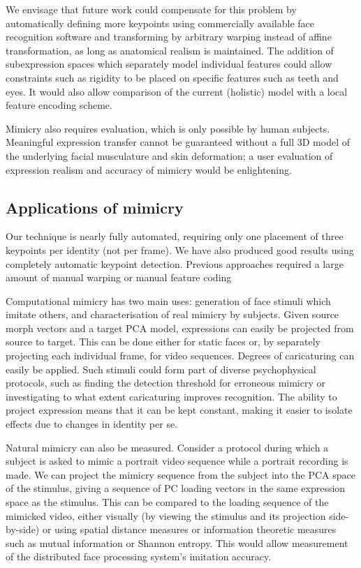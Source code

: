 \documentclass[runningheads]{llncs}
\begin{document}
We envisage that future work could compensate for this problem by automatically defining more keypoints using commercially available face recognition software and transforming by arbitrary warping instead of affine transformation, as long as anatomical realism is maintained.
The addition of subexpression spaces which separately model individual features could allow constraints such as rigidity to be placed on specific features such as teeth and eyes. It would also allow comparison of the current (holistic) model with a local feature encoding scheme.

Mimicry also requires evaluation, which is only possible by human subjects. Meaningful expression transfer cannot be guaranteed without a full 3D model of the underlying facial musculature and skin deformation; a user evaluation of expression realism and accuracy of mimicry would be enlightening.

\subsection{Applications of mimicry}

Our technique is nearly fully automated, requiring only one placement of three keypoints per identity (not per frame). We have also produced good results using completely automatic keypoint detection. Previous approaches required a large amount of manual warping\cite{liu2001expressive} or manual feature coding\cite{theobald2007real} 

Computational mimicry has two main uses: generation of face stimuli which imitate others, and characterisation of real mimicry by subjects.
Given source morph vectors and a target PCA model, expressions can easily be projected from source to target. This can be done either for static faces or, by separately projecting each individual frame, for video sequences. Degrees of caricaturing can easily be applied. Such stimuli could form part of diverse psychophysical protocols, such as finding the detection threshold for erroneous mimicry or investigating to what extent caricaturing improves recognition. The ability to project expression means that it can be kept constant, making it easier to isolate effects due to changes in identity per se. 

Natural mimicry can also be measured. Consider a protocol during which a subject is asked to mimic a portrait video sequence while a portrait recording is made. We can project the mimicry sequence from the subject into the PCA space of the stimulus, giving a sequence of PC loading vectors in the same expression space as the stimulus. This can be compared to the loading sequence of the mimicked video, either visually (by viewing the stimulus and its projection side-by-side) or using spatial distance measures or information theoretic measures such as mutual information or Shannon entropy. This would allow measurement of the distributed\cite{haxby2000distributed} face processing system's imitation accuracy.
\end{document}
